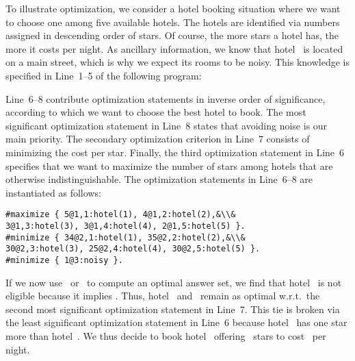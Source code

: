 \begin{example}\label{ex:opt}
To illustrate optimization, we consider a hotel booking situation
where we want to choose one among five available hotels.
The hotels are identified via numbers assigned in descending order of stars.
Of course, the more stars a hotel has, the more it costs per night.
As ancillary information, we know that hotel~ is located
on a main street, which is why we expect its rooms to be noisy.
This knowledge is specified in Line~1--5 of the following program:
%

%
Line~6--8 contribute optimization statements in inverse order of significance,
according to which we want to choose the best hotel to book.
The most significant optimization statement in Line~8 states that
avoiding noise is our main priority.
The secondary optimization criterion in Line~7 consists of
minimizing the cost per star.
Finally, the third optimization statement in Line~6 specifies that we want
to maximize the number of stars among hotels that are otherwise indistinguishable.
The optimization statements in Line~6--8 are instantiated as follows:%
%
\begin{lstlisting}[firstnumber=6,breakindent=0pt,escapechar=&]
#maximize { 5@1,1:hotel(1), 4@1,2:hotel(2),&\\&            3@1,3:hotel(3), 3@1,4:hotel(4), 2@1,5:hotel(5) }.
#minimize { 34@2,1:hotel(1), 35@2,2:hotel(2),&\\&            30@2,3:hotel(3), 25@2,4:hotel(4), 30@2,5:hotel(5) }.
#minimize { 1@3:noisy }.
\end{lstlisting}
If we now use \clasp\ or \clingo\ to compute an optimal answer set,%
we find that hotel~ is not eligible because it implies .
Thus, hotel~ and~ remain as optimal w.r.t.\ the second most
significant optimization statement in Line~7.
This tie is broken via the least significant optimization statement in Line~6
because hotel~ has one star more than hotel~.
We thus decide to book hotel~ offering~ stars
to cost~ per night.
\eexample
\end{example}


